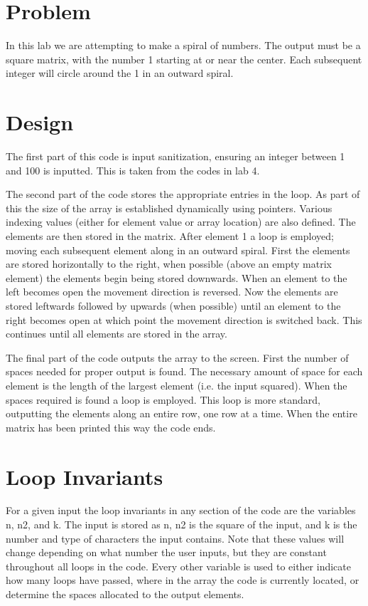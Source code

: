\documentclass{article}
\begin{document}
\newcommand\tab[1][1cm]{\hspace{#1}}

\section{Problem}
In this lab we are attempting to make a spiral of numbers. The output must be a square matrix, with the number 1 starting at or near the center. Each subsequent integer will circle around the 1 in an outward spiral.

\section{Design}
The first part of this code is input sanitization, ensuring an integer between 1 and 100 is inputted. This is taken from the codes in lab 4.

The second part of the code stores the appropriate entries in the loop. As part of this the size of the array is established dynamically using pointers. Various indexing values (either for element value or array location) are also defined. The elements are then stored in the matrix. After element 1 a loop is employed; moving each subsequent element along in an outward spiral. First the elements are stored horizontally to the right, when possible (above an empty matrix element) the elements begin being stored downwards. When an element to the left becomes open the movement direction is reversed. Now the elements are stored leftwards followed by upwards (when possible) until an element to the right becomes open at which point the movement direction is switched back. This continues until all elements are stored in the array.

The final part of the code outputs the array to the screen. First the number of spaces needed for proper output is found. The necessary amount of space for each element is the length of the largest element (i.e. the input squared). When the spaces required is found a loop is employed. This loop is more standard, outputting the elements along an entire row, one row at a time. When the entire matrix has been printed this way the code ends.

\section{Loop Invariants}
For a given input the loop invariants in any section of the code are the variables n, n2, and k. The input is stored as n, n2 is the square of the input, and k is the number and type of characters the input contains. Note that these values will change depending on what number the user inputs, but they are constant throughout all loops in the code. Every other variable is used to either indicate how many loops have passed, where in the array the code is currently located, or determine the spaces allocated to the output elements.
\end{document}

